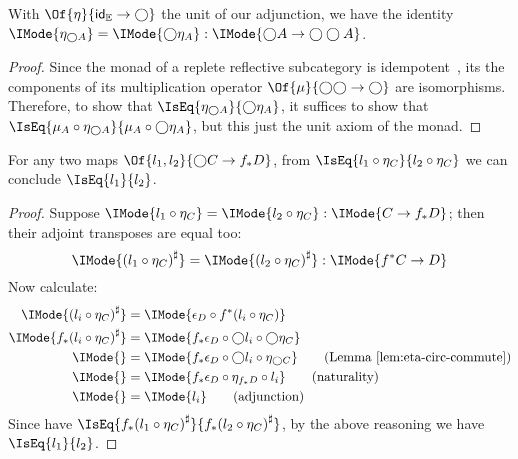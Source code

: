 \documentclass{article}
\newcommand\AIsEq[2]{\IMode{#1} &=\IMode{#2}}
\newcommand\ArrId[1]{\mathsf{id}_{#1}}
\newcommand\IsEqOf[3]{\IMode{#1}=\IMode{#2}:\IMode{#3}}
\begin{document}
\newcommand\MkCone[3]{\left(#1,\MkFam{#2}{#3}\right)}
\newcommand\MkFam[2]{{\left[#1\right]}_{#2}}

\begin{lem}\label{lem:eta-circ-commute}
  With $\Of{\eta}{\ArrId{\mathbb{E}}\to\bigcirc}$ the unit of our
  adjunction, we have the identity
  $\IsEqOf{\eta_{\bigcirc A}}{\bigcirc\eta_A}{\bigcirc
    A\to\bigcirc\bigcirc A}$.
\end{lem}
\begin{proof}
  Since the monad of a replete reflective subcategory is
  idempotent~\cite{borceux:1994:vol2}, its the components of its
  multiplication operator $\Of{\mu}{\bigcirc\bigcirc\to\bigcirc}$ are
  isomorphisms. Therefore, to show that
  $\IsEq{\eta_{\bigcirc A}}{\bigcirc\eta_A}$, it suffices to show that
  $\IsEq{\mu_A\circ\eta_{\bigcirc A}}{\mu_A\circ\bigcirc\eta_A}$, but
  this just the unit axiom of the monad.
\end{proof}

\begin{lem}\label{lem:precompose-eta}
  For any two maps $\Of{l_1,l_2}{\bigcirc C\to f_*D}$, from
  $\IsEq{l_1\circ\eta_C}{l_2\circ\eta_C}$ we can conclude $\IsEq{l_1}{l_2}$.
\end{lem}
\begin{proof}
  Suppose $\IsEqOf{l_1\circ\eta_C}{l_2\circ\eta_C}{C\to f_*D}$; then their
  adjoint transposes are equal too:
  \[
    \IsEqOf{
      {(l_1\circ\eta_C)}^\sharp
    }{
      {(l_2\circ\eta_C)}^\sharp
    }{
      f^*C\to D
    }
  \]
  Now calculate:
  \begin{align*}
    \AIsEq{
      {(l_i\circ\eta_C)}^\sharp
    }{
      \epsilon_D\circ f^*(l_i\circ \eta_C)
    }
    \\
    \AIsEq{
      f_*{(l_i\circ\eta_C)}^\sharp
    }{
      f_*\epsilon_D\circ \bigcirc l_i\circ \bigcirc\eta_C
    }
    \\
    \AIsEq{
    }{
      f_*\epsilon_D\circ \bigcirc l_i\circ \eta_{\bigcirc C}
    }\tag{Lemma~\ref{lem:eta-circ-commute}}
    \\
    \AIsEq{
    }{
      f_*\epsilon_D\circ \eta_{f_*D} \circ l_i
    }
    \tag{naturality}
    \\
    \AIsEq{
    }{
      l_i
    }
    \tag{adjunction}
  \end{align*}
%
  Since have
  $\IsEq{f_*{(l_1\circ\eta_C)}^\sharp}{f_*{(l_2\circ\eta_C)}^\sharp}$,
  by the above reasoning we have $\IsEq{l_1}{l_2}$.
\end{proof}
\end{document}

